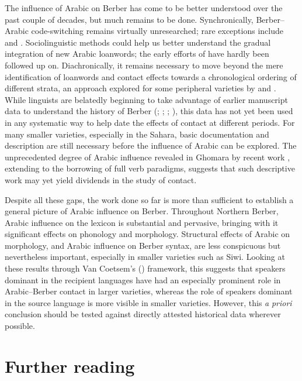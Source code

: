 \documentclass[output=paper]{langsci/langscibook}
\begin{document}
The influence of Arabic on Berber has come to be better understood over the past couple of decades, but much remains to be done.  Synchronically, Berber–Arabic code-switching remains virtually unresearched; rare exceptions include \citet{Hamza2007} and \citet{Kossmann2012}. Sociolinguistic methods could help us better understand the gradual integration of new Arabic loanwords; the early efforts of \citet{Brahimi2000} have hardly been followed up on. Diachronically, it remains necessary to move beyond the mere identification of loanwords and contact effects towards a chronological ordering of different strata, an approach explored for some peripheral varieties by \citet{Souag2009} and \citet{vanPuttenBenkato2017}. While linguists are belatedly beginning to take advantage of earlier manuscript data to understand the history of Berber (\citealt{Boogert1997}; \citeyear{Boogert1998}; \citealt{Brugnatelli2011}; \citealt{Meouak2015}), this data has not yet been used in any systematic way to help date the effects of contact at different periods. For many smaller varieties, especially in the Sahara, basic documentation and description are still necessary before the influence of Arabic can be explored. The unprecedented degree of Arabic influence revealed in Ghomara by recent work \citep{Mourigh2016}, extending to the borrowing of full verb paradigms, suggests that such descriptive work may yet yield dividends in the study of contact.

Despite all these gaps, the work done so far is more than sufficient to establish a general picture of Arabic influence on Berber. Throughout Northern Berber, Arabic influence on the lexicon is substantial and pervasive, bringing with it significant effects on phonology and morphology. Structural effects of Arabic on morphology, and Arabic influence on Berber syntax, are less conspicuous but nevertheless important, especially in smaller varieties such as Siwi. Looking at these results through Van Coetsem's (\citeyear{VanCoetsem1988,VanCoetsem2000}) framework, this suggests that speakers dominant in the recipient languages have had an especially prominent role in Arabic–Berber contact in larger varieties, whereas the role of speakers dominant in the source language is more visible in smaller varieties.  However, this \textit{a} \textit{priori} conclusion should be tested against directly attested historical data wherever possible.

\section*{Further reading}
\end{document}
